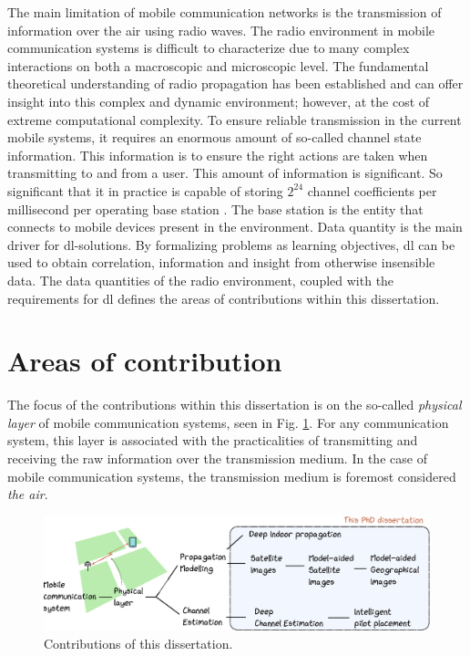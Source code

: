 The main limitation of mobile communication networks is the transmission of information over the air using radio waves. The radio environment in mobile communication systems is difficult to characterize due to many complex interactions on both a macroscopic and microscopic level. The fundamental theoretical understanding of radio propagation has been established and can offer insight into this complex and dynamic environment; however, at the cost of extreme computational complexity. To ensure reliable transmission in the current mobile systems, it requires an enormous amount of so-called channel state information. This information is to ensure the right actions are taken when transmitting to and from a user. This amount of information is significant. So significant that it in practice is capable of storing $2^{24}$ channel coefficients per millisecond per operating base station \cite{Studer2018}. The base station is the entity that connects to mobile devices present in the environment. Data quantity is the main driver for \acrlong{dl}-solutions.  By formalizing problems as learning objectives, \acrlong{dl} can be used to obtain correlation, information and insight from otherwise insensible data. The data quantities of the radio environment, coupled with the requirements for \acrlong{dl} defines the areas of contributions within this dissertation.


\section*{Areas of contribution}
The focus of the contributions within this dissertation is on the so-called \emph{physical layer} of mobile communication systems, seen in Fig. \ref{fig:areas_of_contribution}. For any communication system, this layer is associated with the practicalities of transmitting and receiving the raw information over the transmission medium. In the case of mobile communication systems, the transmission medium is foremost considered \emph{the air}. 


\begin{figure}
\includegraphics[width=\textwidth]{chapters/figures/intro_figure.eps}
\caption{Contributions of this dissertation.}\label{fig:areas_of_contribution}
\end{figure}

